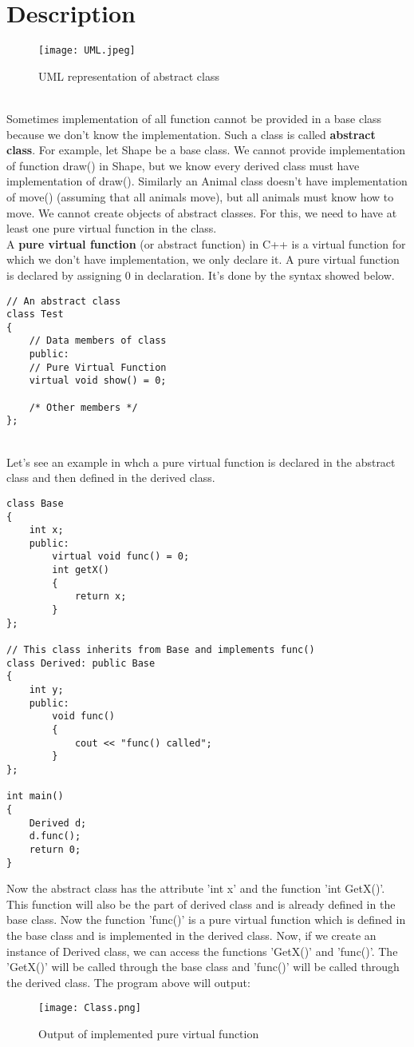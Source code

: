 \documentclass[11pt,fleqn]{book} %
\begin{document}
\section{Description}
\begin{figure}[H]
	\centering
	\texttt{[image: UML.jpeg]}
	\caption{UML representation of abstract class}
\end{figure} ~\\
Sometimes implementation of all function cannot be provided in a base class because we don’t know the implementation. Such a class is called \textbf{abstract class}. For example, let Shape be a base class. We cannot provide implementation of function draw() in Shape, but we know every derived class must have implementation of draw(). Similarly an Animal class doesn’t have implementation of move() (assuming that all animals move), but all animals must know how to move. We cannot create objects of abstract classes. For this, we need to have at least one pure virtual function in the class. \\
A \textbf{pure virtual function} (or abstract function) in C++ is a virtual function for which we don’t have implementation, we only declare it. A pure virtual function is declared by assigning 0 in declaration. It's done by the syntax showed below.
\begin{lstlisting}
// An abstract class
class Test
{   
	// Data members of class
	public:
	// Pure Virtual Function
	virtual void show() = 0;

	/* Other members */
};
\end{lstlisting} ~\\
Let's see an example in whch a pure virtual function is declared in the abstract class and then defined in the derived class.
\begin{example}
\begin{lstlisting}
class Base
{
	int x;
	public:
		virtual void func() = 0;
		int getX() 
		{
			return x; 
		}
};

// This class inherits from Base and implements func()
class Derived: public Base
{
	int y;
	public:
		void func()
		{
			cout << "func() called";
		}
};

int main()
{
	Derived d;
	d.func();
	return 0;
}
\end{lstlisting}
Now the abstract class has the attribute 'int x' and the function 'int GetX()'. This function will also be the part of derived class and is already defined in the base class. Now the function 'func()' is a pure virtual function which is defined in the base class and is implemented in the derived class. Now, if we create an instance of Derived class, we can access the functions 'GetX()' and 'func()'. The 'GetX()' will be called through the base class and 'func()' will be called through the derived class.
The program above will output:
\begin{figure}[H]
	\centering
	\texttt{[image: Class.png]}
	\caption{Output of implemented pure virtual function}
\end{figure}
\end{example}
\end{document}
